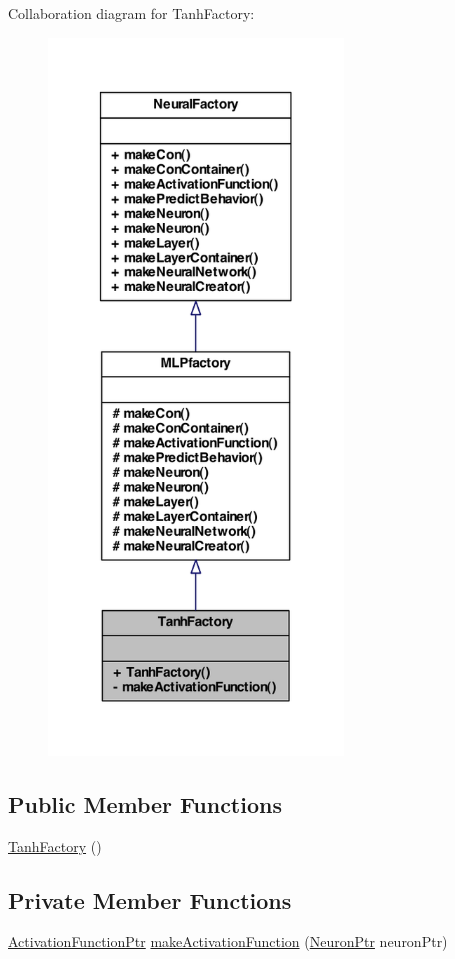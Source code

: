 Collaboration diagram for TanhFactory:\nopagebreak
\begin{figure}[H]
\begin{center}
\leavevmode
\includegraphics[width=222pt]{class_tanh_factory__coll__graph}
\end{center}
\end{figure}
\subsection*{Public Member Functions}
\begin{DoxyCompactItemize}
\item 
\hyperlink{class_tanh_factory_a71d20d925cd8a40fdc52f45451d11ffa}{TanhFactory} ()
\end{DoxyCompactItemize}
\subsection*{Private Member Functions}
\begin{DoxyCompactItemize}
\item 
\hyperlink{_a_m_o_r_e_8h_a77602a0277a02e5769c3df0adc669b17}{ActivationFunctionPtr} \hyperlink{class_tanh_factory_a476450ea27b571e3548377afd1625372}{makeActivationFunction} (\hyperlink{_a_m_o_r_e_8h_ac1ea936c2c7728eb382278131652fef4}{NeuronPtr} neuronPtr)
\end{DoxyCompactItemize}


